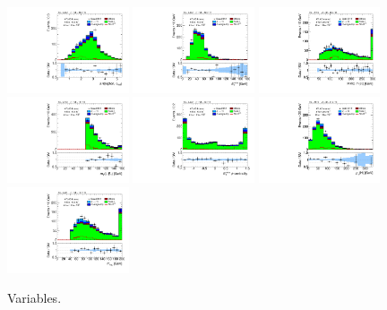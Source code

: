 \begin{figure}[tp]
  \includegraphics[width=0.32\textwidth]{figures/analysis/vbf-WlvCR/taulep-dR}
  \includegraphics[width=0.32\textwidth]{figures/analysis/vbf-WlvCR/met-pt-hi}
  \includegraphics[width=0.32\textwidth]{figures/analysis/vbf-WlvCR/mMMC}
  \includegraphics[width=0.32\textwidth]{figures/analysis/vbf-WlvCR/mT-hi}
  \includegraphics[width=0.32\textwidth]{figures/analysis/vbf-WlvCR/met-phi-centrality}
  \includegraphics[width=0.32\textwidth]{figures/analysis/vbf-WlvCR/H-pt-hi}
  \includegraphics[width=0.32\textwidth]{figures/analysis/vbf-WlvCR/mvis}
  \caption{Variables.}
  \label{fig:backgrounds-WlvCR-taus}
\end{figure}

